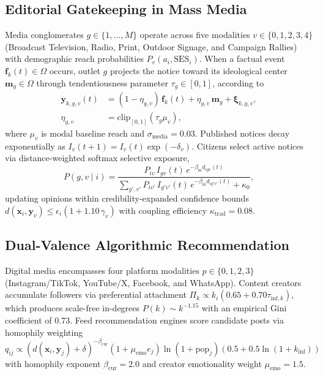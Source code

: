 \documentclass[a4paper,fleqn]{cas-dc}
\begin{document}
\subsection{Editorial Gatekeeping in Mass Media}
\label{subsec:mass_media}
Media conglomerates $g \in \{1, \dots, M\}$ operate across five modalities $v \in \{0, 1, 2, 3, 4\}$ (Broadcast Television, Radio, Print, Outdoor Signage, and Campaign Rallies) with demographic reach probabilities $P_v(a_i, \mathrm{SES}_i)$. When a factual event $\mathbf{f}_k(t) \in \Omega$ occurs, outlet $g$ projects the notice toward its ideological center $\mathbf{m}_g \in \Omega$ through tendentiousness parameter $\tau_g \in [0, 1]$, according to
\begin{equation}
\begin{aligned}
    \mathbf{y}_{k,g,v}(t) &= (1 - \eta_{g,v})\,\mathbf{f}_k(t) + \eta_{g,v}\,\mathbf{m}_g + \boldsymbol{\xi}_{k,g,v}, \\
    \eta_{g,v} &= \mathrm{clip}_{[0, 1]}(\tau_g \mu_v),
\end{aligned}
\label{eq:methods_media_projection}
\end{equation}
where $\mu_v$ is modal baseline reach and $\sigma_{\mathrm{media}} = 0.03$. Published notices decay exponentially as $I_v(t+1) = I_v(t)\exp(-\delta_v)$. Citizens select active notices via distance-weighted softmax selective exposure,
\begin{equation}
    P(g, v \mid i) = \frac{P_{iv} \, I_{gv}(t) \, e^{-\beta_{\mathrm{m}} d_{igv}(t)}}{\sum_{g',v'} P_{iv'} \, I_{g'v'}(t) \, e^{-\beta_{\mathrm{m}} d_{ig'v'}(t)} + \kappa_0},
    \label{eq:methods_selective_exposure}
\end{equation}
updating opinions within credibility-expanded confidence bounds $d(\mathbf{x}_i, \mathbf{y}_v) \le \epsilon_i (1 + 1.10\,\gamma_v)$ with coupling efficiency $\kappa_{\mathrm{trad}} = 0.08$.

\subsection{Dual-Valence Algorithmic Recommendation}
\label{subsec:digital_platforms}
Digital media encompasses four platform modalities $p \in \{0, 1, 2, 3\}$ (Instagram/TikTok, YouTube/X, Facebook, and WhatsApp). Content creators accumulate followers via preferential attachment $\Pi_k \propto k_i (0.65 + 0.70\tau_{\mathrm{inf}, k})$, which produces scale-free in-degrees $P(k) \sim k^{-1.15}$ with an empirical Gini coefficient of $0.73$. Feed recommendation engines score candidate posts via homophily weighting $q_{ij} \propto (d(\mathbf{x}_i, \mathbf{y}_j) + \delta)^{-\beta_{\mathrm{cur}}}(1 + \mu_{\mathrm{emo}} e_j)\ln(1 + \mathrm{pop}_j)(0.5 + 0.5\ln(1 + k_{\mathrm{inf}}))$ with homophily exponent $\beta_{\mathrm{cur}} = 2.0$ and creator emotionality weight $\mu_{\mathrm{emo}} = 1.5$.
\end{document}
